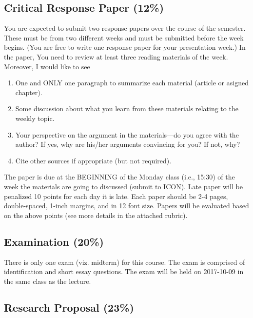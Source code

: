 \documentclass[11pt,]{article}
\providecommand{\tightlist}{%
  \setlength{\itemsep}{0pt}\setlength{\parskip}{0pt}}
\theoremstyle{definition}
\theoremstyle{definition}
\theoremstyle{remark}
\begin{document}
\subsection{Critical Response Paper
(12\%)}\label{critical-response-paper-12}

You are expected to submit two response papers over the course of the
semester. These must be from two different weeks and must be submitted
before the week begins. (You are free to write one response paper for
your presentation week.) In the paper, You need to review at least three
reading materials of the week. Moreover, I would like to see

\begin{enumerate}
\def\labelenumi{\arabic{enumi}.}
\tightlist
\item
  One and ONLY one paragraph to summarize each material (article or
  asigned chapter).
\item
  Some discussion about what you learn from these materials relating to
  the weekly topic.
\item
  Your perspective on the argument in the materials---do you agree with
  the author? If yes, why are his/her arguments convincing for you? If
  not, why?
\item
  Cite other sources if appropriate (but not required).
\end{enumerate}

The paper is due at the BEGINNING of the Monday class (i.e., 15:30) of
the week the materials are going to discussed (submit to ICON). Late
paper will be penalized 10 points for each day it is late. Each paper
should be 2-4 pages, double-spaced, 1-inch margins, and in 12 font size.
Papers will be evaluated based on the above points (see more details in
the attached rubric).

\subsection{Examination (20\%)}\label{examination-20}

There is only one exam (viz. midterm) for this course. The exam is
comprised of identification and short essay questions. The exam will be
held on 2017-10-09 in the same class as the lecture.

\subsection{Research Proposal (23\%)}\label{research-proposal-23}
\end{document}
